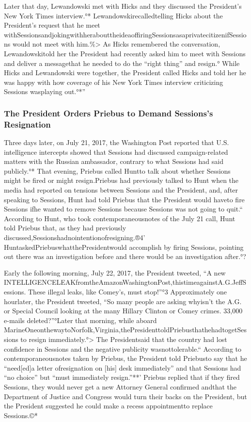 {Later that day, Lewandowski met with Hicks and they discussed the President’s New York Times interview.°*
Lewandowskirecalledtelling Hicks about the President’s request that he meet withSessionsandjokingwithherabouttheideaoffiringSessionsasaprivatecitizenifSessions would not meet with him.\%>
As Hicks remembered the conversation, Lewandowskitold her the President had recently asked him to meet with Sessions and deliver a messagethat he needed to do the “right thing” and resign.°
While Hicks and Lewandowski were together, the President called Hicks and told her he was happy with how coverage of his New York Times interview criticizing Sessions wasplaying out.°*”

\subsubsection{The President Orders Priebus to Demand Sessions's Resignation}

Three days later, on July 21, 2017, the Washington Post reported that U.S. intelligence intercepts showed that Sessions had discussed campaign-related matters with the Russian ambassador, contrary to what Sessions had said publicly.°*
That evening, Priebus called Huntto talk about whether Sessions might be fired or might resign.Priebus had previously talked to Hunt when the media had reported on tensions between Sessions and the President, and, after speaking to Sessions, Hunt had told Priebus that the President would haveto fire Sessions ifhe wanted to remove Sessions because Sessions was not going to quit.“
According to Hunt, who took contemporaneousnotes of the July 21 call, Hunt told Priebus that, as they had previously discussed,Sessionshadnointentionofresigning.®4'
HuntaskedPriebuswhatthePresidentwould accomplish by firing Sessions, pointing out there was an investigation before and there would be an investigation after.°?

Early the following morning, July 22, 2017, the President tweeted, “A new INTELLIGENCELEAKfromtheAmazonWashingtonPost,thistimeagainstA.G.JeffSessions.
These illegal leaks, like Comey’s, must stop!”°3
Approximately one hourlater, the President tweeted, “So many people are asking whyisn’t the A.G. or Special Council looking at the many Hillary Clinton or Comey crimes.
33,000 e-mails deleted?”°Later that morning, while aboard MarineOneonthewaytoNorfolk,Virginia,thePresidenttoldPriebusthathehadtogetSessions to resign immediately.°>
The Presidentsaid that the country had lost confidence in Sessions and the negative publicity wasnottolerable.“
According to contemporaneousnotes taken by Priebus, the President told Priebusto say that he “need[ed]a letter ofresignation on [his] desk immediately” and that Sessions had “no choice” but “must immediately resign.”**’
Priebus replied that if they fired Sessions, they would never get a new Attorney General confirmed andthat the Department of Justice and Congress would turn their backs on the President, but the President suggested he could make a recess appointmentto replace Sessions.©*

}
